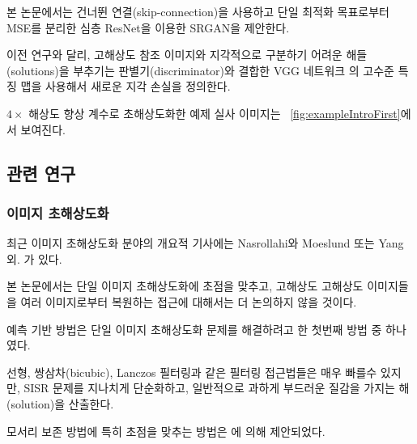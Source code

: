 \documentclass[10pt,twocolumn,letterpaper]{article}
\newcommand{\kor}[1]{#1}
\newcommand{\eng}[1]{}
\begin{document}
\eng{
In this work we propose a \ac{SRGAN} for which we employ a deep \ac{ResNet} with skip-connection and diverge from \ac{MSE} as the sole optimization target.
}\kor{
본 논문에서는 건너뛴 연결(skip-connection)을 사용하고 단일 최적화 목표로부터 \ac{MSE}를 분리한 심층 \ac{ResNet}을 이용한 \ac{SRGAN}을 제안한다.
}\eng{
 Different from previous works, we define a novel perceptual loss using high-level feature maps of the VGG network \cite{simonyan2014very,Johnson16PercepLoss,bruna2016super} combined with a discriminator that encourages solutions perceptually hard to distinguish from the \ac{HR} reference images.
}\kor{
 이전 연구와 달리, \ac{고해상도} 참조 이미지와 지각적으로 구분하기 어려운 해들(solutions)을 부추기는 판별기(discriminator)와 결합한 VGG 네트워크 \cite{simonyan2014very,Johnson16PercepLoss,bruna2016super}의 고수준 특징 맵을 사용해서 새로운 지각 손실을 정의한다.
}
\eng{
An example photo-realistic image that was super-resolved with a $4\times$ upscaling factor is shown in \figurename~\ref{fig:exampleIntroFirst}.
}\kor{
$4\times$ 해상도 향상 계수로 초해상도화한 예제 실사 이미지는 \figurename~\ref{fig:exampleIntroFirst}에서 보여진다.
}

\subsection{관련 연구}
\subsubsection{이미지 초해상도화}
\eng{
Recent overview articles on image \ac{SR} include Nasrollahi and Moeslund \cite{Nasrollahi2014} or Yang et al. \cite{Yang14benchmark}.
}\kor{
최근 이미지 \ac{초해상도화} 분야의 개요적 기사에는 Nasrollahi와 Moeslund \cite{Nasrollahi2014} 또는 Yang 외. 가 있다.
}\eng{
Here we will focus on \ac{SISR} and will not further discuss approaches that recover \ac{HR} images from multiple images \cite{Borman1998aSurvey,Farsiu2004}.
}\kor{
본 논문에서는 \ac{단일 이미지 초해상도화}에 초점을 맞추고, 고해상도 \ac{고해상도} 이미지들을 여러 이미지로부터 복원하는 \cite{Borman1998aSurvey,Farsiu2004} 접근에 대해서는 더 논의하지 않을 것이다.
}


\eng{
Prediction-based methods were among the first methods to tackle \ac{SISR}.
}\kor{
예측 기반 방법은 \ac{단일 이미지 초해상도화} 문제를 해결하려고 한 첫번째 방법 중 하나였다.
} \eng{
While these filtering approaches, \eg linear, bicubic or Lanczos \cite{Duchon1979} filtering, can be very fast, they oversimplify the \ac{SISR} problem and usually yield solutions with overly smooth textures.
}\kor{
\eg 선형, 쌍삼차(bicubic), Lanczos \cite{Duchon1979} 필터링과 같은 필터링 접근법들은 매우 빠를수 있지만, \ac{SISR} 문제를 지나치게 단순화하고, 일반적으로 과하게 부드러운 질감을 가지는 해(solution)을 산출한다.
}
\eng{
Methods that put particularly focus on edge-preservation have been proposed \cite{Allebach96, Li2001}.
}\kor{
모서리 보존 방법에 특히 초점을 맞추는 방법은 \cite{Allebach96, Li2001}에 의해 제안되었다.
}
\end{document}
